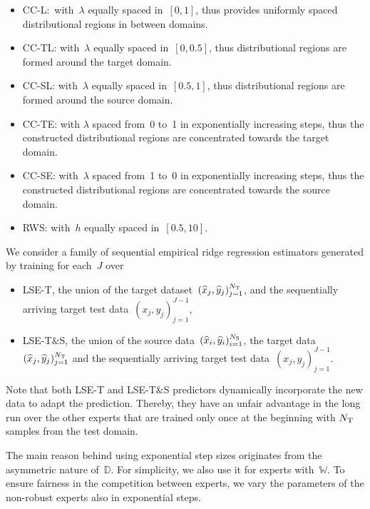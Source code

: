 \documentclass{article}
\begin{document}
    \begin{itemize}[leftmargin =4mm, itemsep=0.5mm]
    \vspace{-.3cm}
        \item  CC-L:~with~$\lambda$ equally spaced in~$[0, 1]$, thus provides uniformly spaced distributional regions in between domains.
        \item CC-TL: with~$\lambda$ equally spaced in~$[0, 0.5]$, thus distributional regions are formed around the target domain.
        \item CC-SL: with~$\lambda$ equally spaced in~$[0.5, 1]$, thus distributional regions are formed around the source domain.
        \item CC-TE: with $\lambda$ spaced from~0 to~1 in exponentially increasing steps, thus the constructed distributional regions are concentrated towards the target domain. 
        \item CC-SE: with~$\lambda$ spaced from~1 to~0 in exponentially increasing steps, thus the constructed distributional regions are concentrated towards the source domain. 
        \item RWS: with~$h$ equally spaced in~$[0.5, 10]$.
    \end{itemize}
    \vspace{-.3cm}
    
    We consider a family of sequential empirical ridge regression estimators generated by training for each~$J$ over
    \begin{itemize}[leftmargin =4mm, itemsep=0.5mm]
    \vspace{-.3cm}
        \item LSE-T, the union of the target dataset~$(\widehat x_j, \widehat y_j)_{j=1}^{N_{\rm T}}$, and the sequentially arriving target test data~$(x_j, y_j)_{j=1}^{J-1}$,
        \item LSE-T$\&$S, the union of the source data~$(\widehat x_i, \widehat y_i)_{i=1}^{N_{\rm S}}$, the target data~$(\widehat x_j, \widehat y_j)_{j=1}^{N_{\rm T}}$ and the sequentially arriving target test data~$(x_j, y_j)_{j=1}^{J-1}$.
    \end{itemize} 
\vspace{-.2cm}
 Note that both LSE-T and LSE-T$\&$S predictors dynamically incorporate the new data to adapt the prediction. Thereby, they have an unfair advantage  in the long run over the other experts that are trained only once at the beginning with $N_{\rm T}$ samples from the test domain. 
 
 The main reason behind using exponential step sizes originates from the asymmetric nature of~$\mathds D$. For simplicity, we also use it for experts with~$\mathds W$.
To ensure fairness in the competition between experts, we vary the parameters of the non-robust experts also in exponential steps.
\end{document}
